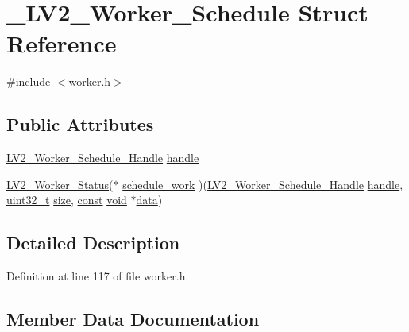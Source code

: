 \hypertarget{struct___l_v2___worker___schedule}{}\section{\+\_\+\+L\+V2\+\_\+\+Worker\+\_\+\+Schedule Struct Reference}
\label{struct___l_v2___worker___schedule}


{\ttfamily \#include $<$worker.\+h$>$}

\subsection*{Public Attributes}
\begin{DoxyCompactItemize}
\item 
\hyperlink{worker_8h_a9efb80379346b1f939af6d69eb2e08ad}{L\+V2\+\_\+\+Worker\+\_\+\+Schedule\+\_\+\+Handle} \hyperlink{struct___l_v2___worker___schedule_a2ab941993d8d5d0376f079b88a46619c}{handle}
\item 
\hyperlink{worker_8h_a5f3f4a39cc339d42f0823524940aee9f}{L\+V2\+\_\+\+Worker\+\_\+\+Status}($\ast$ \hyperlink{struct___l_v2___worker___schedule_a04216002a3a30b5ccdaeb91a58554d26}{schedule\+\_\+work} )(\hyperlink{worker_8h_a9efb80379346b1f939af6d69eb2e08ad}{L\+V2\+\_\+\+Worker\+\_\+\+Schedule\+\_\+\+Handle} \hyperlink{struct___l_v2___worker___schedule_a2ab941993d8d5d0376f079b88a46619c}{handle}, \hyperlink{lib-src_2ffmpeg_2win32_2stdint_8h_a6eb1e68cc391dd753bc8ce896dbb8315}{uint32\+\_\+t} \hyperlink{group__lavu__mem_ga854352f53b148adc24983a58a1866d66}{size}, \hyperlink{getopt1_8c_a2c212835823e3c54a8ab6d95c652660e}{const} \hyperlink{sound_8c_ae35f5844602719cf66324f4de2a658b3}{void} $\ast$\hyperlink{lib_2expat_8h_ac39e72a1de1cb50dbdc54b08d0432a24}{data})
\end{DoxyCompactItemize}


\subsection{Detailed Description}


Definition at line 117 of file worker.\+h.



\subsection{Member Data Documentation}
